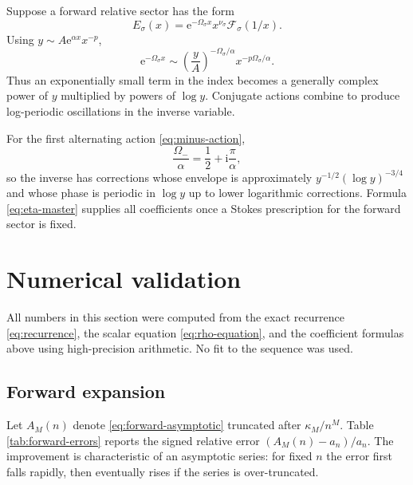 \documentclass[11pt]{article}
\theoremstyle{definition}
\theoremstyle{remark}
\newcommand{\e}{\mathrm e}
\newcommand{\ii}{\mathrm i}
\begin{document}
Suppose a forward relative sector has the form
\begin{equation}
 E_\sigma(x)=\e^{-\Omega_\sigma x}x^{\nu_\sigma}
 \mathcal F_\sigma(1/x).
 \label{eq:E-sigma}
\end{equation}
Using $y\sim A\e^{\alpha x}x^{-p}$,
\begin{equation}
 \e^{-\Omega_\sigma x}
 \sim \left(\frac yA\right)^{-\Omega_\sigma/\alpha}
 x^{-p\Omega_\sigma/\alpha}.
 \label{eq:action-map}
\end{equation}
Thus an exponentially small term in the index becomes a generally complex
power of $y$ multiplied by powers of $\log y$.  Conjugate actions combine to
produce log-periodic oscillations in the inverse variable.

For the first alternating action \cref{eq:minus-action},
\begin{equation}
 \frac{\Omega_-}{\alpha}=\frac12+\ii\frac\pi\alpha,
 \label{eq:minus-inverse-power}
\end{equation}
so the inverse has corrections whose envelope is approximately
$y^{-1/2}(\log y)^{-3/4}$ and whose phase is periodic in $\log y$ up to lower
logarithmic corrections.  Formula \cref{eq:eta-master} supplies all
coefficients once a Stokes prescription for the forward sector is fixed.

\section{Numerical validation}
\label{sec:numerics}

All numbers in this section were computed from the exact recurrence
\cref{eq:recurrence}, the scalar equation \cref{eq:rho-equation}, and the
coefficient formulas above using high-precision arithmetic.  No fit to the
sequence was used.

\subsection{Forward expansion}

Let $A_M(n)$ denote \cref{eq:forward-asymptotic} truncated after
$\kappa_M/n^M$.  Table \ref{tab:forward-errors} reports the signed relative
error $(A_M(n)-a_n)/a_n$.  The improvement is characteristic of an asymptotic
series: for fixed $n$ the error first falls rapidly, then eventually rises if
the series is over-truncated.
\end{document}
